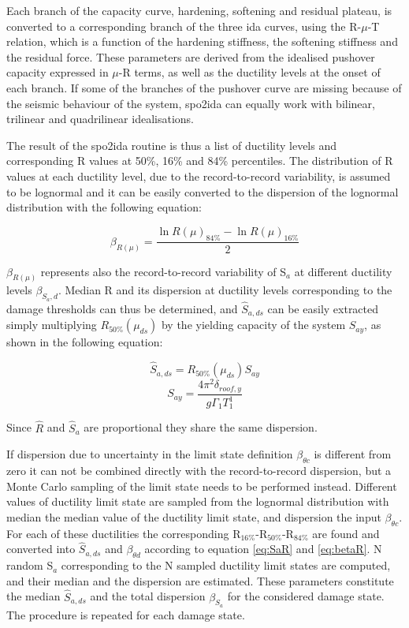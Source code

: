 Each branch of the capacity curve, hardening, softening and residual plateau, is converted to a corresponding branch of the three ida curves, using the R-$\mu$-T relation, which is a function of the hardening stiffness, the softening stiffness and the residual force. These parameters are derived from the idealised pushover capacity expressed in $\mu$-R terms, as well as the ductility levels at the onset of each branch. If some of the branches of the pushover curve are missing because of the seismic behaviour of the system, spo2ida can equally work with bilinear, trilinear and quadrilinear idealisations.

The result of the spo2ida routine is thus a list of ductility levels and corresponding R values at 50\%, 16\% and 84\% percentiles. The distribution of R values at each ductility level, due to the record-to-record variability, is assumed to be lognormal and it can be easily converted to the dispersion of the lognormal distribution with the following equation:

\begin{equation}
\beta_{R(\mu)} = \frac{\ln R(\mu)_{84\%} - \ln R(\mu)_{16\%}}{2}
\label{eq:betaR}
\end{equation} 

$\beta_{R(\mu)}$ represents also the record-to-record variability of S$_a$ at different ductility levels $\beta_{S_a, d}$. Median R and its dispersion at ductility levels corresponding to the damage thresholds can thus be determined, and $\hat{S}_{a,ds}$ can be easily extracted simply multiplying $R_{50\%}(\mu_{ds})$ by the yielding capacity of the system $S_{ay}$, as shown in the following equation:

\begin{equation}
\hat{S}_{a,ds} = R_{50\%}(\mu_{ds}) S_{ay}
\label{eq:SaR}
\end{equation}
\begin{equation}
S_{ay} = \frac{4 \pi^2 \delta_{roof,y}}{g \Gamma_1 T_1^1}
\end{equation}

Since $\hat{R}$ and $\hat{S}_{a}$ are proportional they share the same dispersion.

If dispersion due to uncertainty in the limit state definition $\beta_{\theta c}$ is different from zero it can not be combined directly with the record-to-record dispersion, but a Monte Carlo sampling of the limit state needs to be performed instead. Different values of ductility limit state are sampled from the  lognormal distribution with median the median value of the ductility limit state, and dispersion the input $\beta_{\theta c}$. For each of these ductilities the corresponding R$_{16\%}$-R$_{50\%}$-R$_{84\%}$ are found and converted into $\hat{S}_{a,ds}$ and $\beta_{\theta d}$ according to equation \ref{eq:SaR} and \ref{eq:betaR}. N random S$_a$ corresponding to the N sampled ductility limit states are computed, and their median and the dispersion are estimated. These parameters constitute the median $\hat{S}_{a,ds}$ and the total dispersion $\beta_{S_a}$ for the considered damage state. The procedure is repeated for each damage state.

